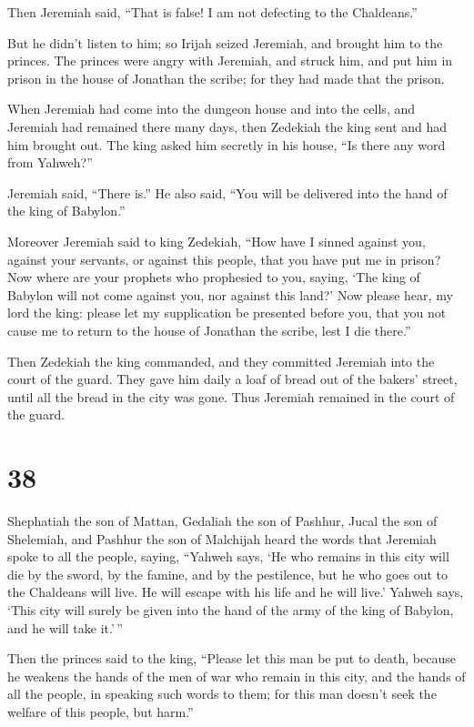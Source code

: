  Then Jeremiah said, ``That is false! I am not defecting to
the Chaldeans.''

But he didn't listen to him; so Irijah seized Jeremiah, and brought him
to the princes.  The princes were angry with Jeremiah, and
struck him, and put him in prison in the house of Jonathan the scribe;
for they had made that the prison.

 When Jeremiah had come into the dungeon house and into the
cells, and Jeremiah had remained there many days,  then
Zedekiah the king sent and had him brought out. The king asked him
secretly in his house, ``Is there any word from Yahweh?''

Jeremiah said, ``There is.'' He also said, ``You will be delivered into
the hand of the king of Babylon.''

 Moreover Jeremiah said to king Zedekiah, ``How have I
sinned against you, against your servants, or against this people, that
you have put me in prison?  Now where are your prophets who
prophesied to you, saying, `The king of Babylon will not come against
you, nor against this land?'  Now please hear, my lord the
king: please let my supplication be presented before you, that you not
cause me to return to the house of Jonathan the scribe, lest I die
there.''

 Then Zedekiah the king commanded, and they committed
Jeremiah into the court of the guard. They gave him daily a loaf of
bread out of the bakers' street, until all the bread in the city was
gone. Thus Jeremiah remained in the court of the guard.

\hypertarget{section-37}{%
\section{38}\label{section-37}}

 Shephatiah the son of Mattan, Gedaliah the son of Pashhur,
Jucal the son of Shelemiah, and Pashhur the son of Malchijah heard the
words that Jeremiah spoke to all the people, saying, 
``Yahweh says, `He who remains in this city will die by the sword, by
the famine, and by the pestilence, but he who goes out to the Chaldeans
will live. He will escape with his life and he will live.' 
Yahweh says, `This city will surely be given into the hand of the army
of the king of Babylon, and he will take it.'\,''

 Then the princes said to the king, ``Please let this man be
put to death, because he weakens the hands of the men of war who remain
in this city, and the hands of all the people, in speaking such words to
them; for this man doesn't seek the welfare of this people, but harm.''

